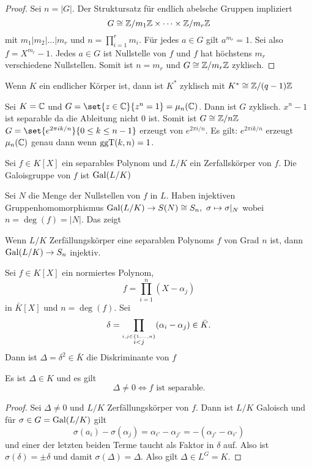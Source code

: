 \begin{proof}
	Sei \(n=|G|\). Der Struktursatz für endlich abelsche Gruppen impliziert 
	\[G\cong \mathbb{Z}/m_1\mathbb{Z}\times \dots\times \mathbb{Z}/m_r\mathbb{Z}\] mit \(m_1|m_2|\dots| m_r\) und \(n=\prod_{i=1}^rm_i\).
	Für jedes \(a\in G\) gilt \(a^{m_r}=1\). Sei also \(f=X^{m_r}-1\). Jedes \(a\in G\) ist Nullstelle von \(f\) und \(f\) hat höchstens \(m_r\) verschiedene Nullstellen. Somit ist \(n=m_r\) und \(G\cong \mathbb{Z}/m_r\mathbb{Z}\) zyklisch.
	
\end{proof}
\begin{Kor}
	Wenn \(K\) ein endlicher Körper ist, dann ist \(K^*\) zyklisch mit \(K^*\cong \mathbb{Z}/(q-1)\mathbb{Z}\)
\end{Kor}
\begin{Bsp}
	Sei \(K=\mathbb{C}\) und \(G=\set{z\in\CC}{ z^n=1}=\mu_n(\CC)\). Dann ist \(G\) zyklisch. \(x^n-1\) ist separable da die Ableitung nicht \(0\) ist. Somit ist \(G\cong \mathbb{Z}/n\mathbb{Z}\) \(G=\set{e^{2\pi i k/n}}{ 0\leq k\leq n-1}\) erzeugt von \(e^{2\pi i/n}\). 
	Es gilt: \(e^{2\pi i k/n}\) erzeugt \(\mu_n(\mathbb{C})\) genau dann wenn \(\operatorname{ggT}(k,n)=1\).
\end{Bsp}
\begin{Def}
	Sei \(f\in K[X]\) ein separables Polynom und \(L/K\) ein Zerfallskörper von \(f\). Die Galoisgruppe von \(f\) ist \(\operatorname{Gal}(L/K)\)
\end{Def}
\begin{Bem}
	Sei \(N\) die Menge der Nullstellen von \(f\) in \(L\).
	Haben injektiven Gruppenhomomorphismus \(\operatorname{Gal}(L/K)\to S(N)\cong S_n,\ \sigma\mapsto \sigma|_N\) wobei \(n=\deg(f)=|N|\). Das zeigt
\end{Bem}
\begin{Satz}
	Wenn \(L/K\) Zerfällungskörper eine separablen Polynoms \(f\) von Grad \(n\) ist, dann \(\operatorname{Gal}(L/K)\to S_n\) injektiv.
\end{Satz}
\begin{Def}[Diskriminante]
	Sei \(f\in K[X]\) ein normiertes Polynom, \[f=\prod_{i=1}^n(X-\alpha_j)\] in \(\bar K[X]\) und \(n=\deg(f)\). Sei 
	\[\delta=\prod_{\stackrel{i,j\in\{1,\dots,n\} }{i<j}}(\alpha_i-\alpha_j)\in\bar K.\]
	Dann ist \(\Delta=\delta^2\in\bar K\) die Diskriminante von \(f\)
\end{Def}
\begin{Lemma}
	Es ist \(\Delta\in K\) und es gilt  \[\Delta\neq 0\iff f \text{ ist separable.}\]
\end{Lemma}
\begin{proof}
	Sei \(\Delta\neq 0\) und \(L/K\) Zerfällungskörper von \(f\).
	Dann ist \(L/K\) Galoisch und für \(\sigma\in G=\operatorname{Gal}(L/K)\) gilt
	\[\sigma(a_i)-\sigma(\alpha_j)=\alpha_{i'}-\alpha_{j'}=-(\alpha_{j'}-\alpha_{i'})\] 
	und einer der letzten beiden Terme taucht als Faktor in \(\delta\) auf. Also ist \(\sigma(\delta)=\pm \delta\) und damit \(\sigma(\Delta)=\Delta\). Also gilt \(\Delta\in L^G=K\).
\end{proof}
